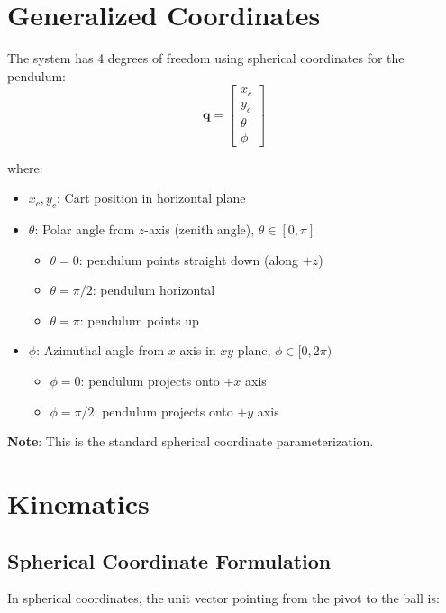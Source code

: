 \documentclass[12pt]{article}
\begin{document}
\section{Generalized Coordinates}

The system has 4 degrees of freedom using spherical coordinates for the pendulum:
\begin{equation}
    \mathbf{q} = \begin{bmatrix} x_c \\ y_c \\ \theta \\ \phi \end{bmatrix}
\end{equation}

where:
\begin{itemize}
    \item $x_c, y_c$: Cart position in horizontal plane
    \item $\theta$: Polar angle from $z$-axis (zenith angle), $\theta \in [0, \pi]$
    \begin{itemize}
        \item $\theta = 0$: pendulum points straight down (along $+z$)
        \item $\theta = \pi/2$: pendulum horizontal
        \item $\theta = \pi$: pendulum points up
    \end{itemize}
    \item $\phi$: Azimuthal angle from $x$-axis in $xy$-plane, $\phi \in [0, 2\pi)$
    \begin{itemize}
        \item $\phi = 0$: pendulum projects onto $+x$ axis
        \item $\phi = \pi/2$: pendulum projects onto $+y$ axis
    \end{itemize}
\end{itemize}

\textbf{Note}: This is the standard spherical coordinate parameterization.

\section{Kinematics}

\subsection{Spherical Coordinate Formulation}

In spherical coordinates, the unit vector pointing from the pivot to the ball is:
\end{document}
